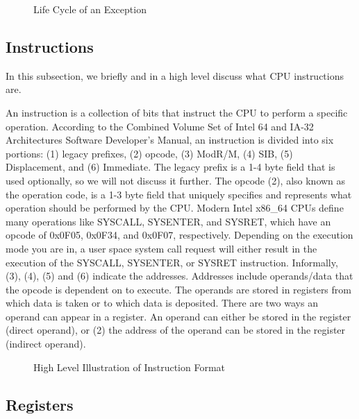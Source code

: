 \documentclass{report}
\begin{document}
\begin{spacing}{1.5}
\begin{figure}[ht]
  \hspace*{1.5cm}
  \caption{Life Cycle of an Exception}
\end{figure}

\subsection{Instructions}

{\large
In this subsection, we briefly and in a high level discuss what CPU instructions are.
\newline
}

{\large
\noindent An instruction is a collection of bits that instruct the CPU to perform a specific operation. According to the Combined Volume Set of Intel 64 and IA-32 Architectures Software Developer’s Manual, an instruction is divided into six portions: (1) legacy prefixes, (2) opcode, (3) ModR/M, (4) SIB, (5) Displacement, and (6) Immediate. The legacy prefix is a 1-4 byte field that is used optionally, so we will not discuss it further. The opcode (2), also known as the operation code, is a 1-3 byte field that uniquely specifies and represents what operation should be performed by the CPU. Modern Intel x86\_64 CPUs define many operations like SYSCALL, SYSENTER, and SYSRET, which have an opcode of 0x0F05, 0x0F34, and 0x0F07, respectively. Depending on the execution mode you are in, a user space system call request will either result in the execution of the SYSCALL, SYSENTER, or SYSRET instruction. Informally, (3), (4), (5) and (6) indicate the addresses. Addresses include operands/data that the opcode is dependent on to execute. The operands are stored in registers from which data is taken or to which data is deposited. There are two ways an operand can appear in a register. An operand can either be stored in the register (direct operand), or (2) the address of the operand can be stored in the register (indirect operand).
\newline
}



\begin{figure}[ht]
    \centering
    \caption{High Level Illustration of Instruction Format}
\end{figure}



\subsection{Registers}


\end{spacing}
\end{document}
